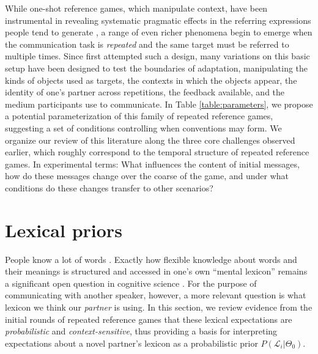 \documentclass[11pt, floatsintext, jou]{apa6}
\begin{document}
While one-shot reference games, which manipulate context, have been instrumental in revealing systematic pragmatic effects in the referring expressions people tend to generate \cite{KraussWeinheimer67_ReferentSimilarity,KoolenGattGoudbeekKrahmer11_Overspecification,GrafEtAl16_BasicLevel,VanDeemter16_ComputationalModelsOfReferring}, a range of even richer phenomena begin to emerge when the communication task is \emph{repeated} and the same target must be referred to multiple times. Since  first attempted such a design, many variations on this basic setup have been designed to test the boundaries of adaptation, manipulating the kinds of objects used as targets, the contexts in which the objects appear, the identity of one's partner across repetitions, the feedback available, and the medium participants use to communicate. In Table \ref{table:parameters}, we propose a potential parameterization of this family of repeated reference games, suggesting a set of conditions controlling when conventions may form. We organize our review of this literature along the three core challenges observed earlier, which roughly correspond to the temporal structure of repeated reference games. In experimental terms: What influences the content of initial messages, how do these messages change over the coarse of the game, and under what conditions do these changes transfer to other scenarios?   %



\section{Lexical priors}

People know a lot of words \cite{BergelsonAslin17_Lexicon}. Exactly how flexible knowledge about words and their meanings is structured and accessed in one's own ``mental lexicon'' remains a significant open question in cognitive science \cite{JonesEtAl15_SemanticMemory,GriffithsSteyversTenenbaum07_Topics,HuthEtAl16_SemanticMaps,GoodmanLassiter14_Semantics}. For the purpose of communicating with another speaker, however, a more relevant question is what lexicon we think our \emph{partner} is using. In this section, we review evidence from the initial rounds of repeated reference games that these lexical expectations are \emph{probabilistic} and \emph{context-sensitive}, thus providing a basis for interpreting expectations about a novel partner's lexicon as a probabilistic prior $P(\mathcal{L}_i | \Theta_0)$. 
\end{document}
